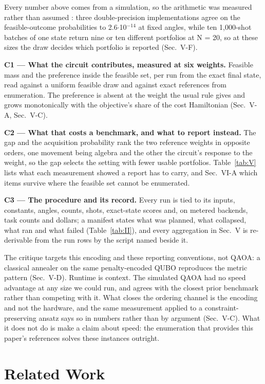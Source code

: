 \documentclass{ieeeaccess}
\begin{document}
Every number above comes from a simulation, so the arithmetic was measured rather than assumed \cite{ref48}: three double-precision implementations agree on the feasible-outcome probabilities to 2.6$\cdot$10$^{-14}$ at fixed angles, while ten 1,000-shot batches of one state return nine or ten different portfolios at N = 20, so at these sizes the draw decides which portfolio is reported (Sec.~V-F).


\textbf{C1 --- What the circuit contributes, measured at six weights.} Feasible mass and the preference inside the feasible set, per run from the exact final state, read against a uniform feasible draw and against exact references from enumeration. The preference is absent at the weight the usual rule gives and grows monotonically with the objective's share of the cost Hamiltonian (Sec.~V-A, Sec.~V-C).


\textbf{C2 --- What that costs a benchmark, and what to report instead.} The gap and the acquisition probability rank the two reference weights in opposite orders, one movement being algebra and the other the circuit's response to the weight, so the gap selects the setting with fewer usable portfolios. Table~\ref{tab:V} lists what each measurement showed a report has to carry, and Sec.~VI-A which items survive where the feasible set cannot be enumerated.


\textbf{C3 --- The procedure and its record.} Every run is tied to its inputs, constants, angles, counts, shots, exact-state scores and, on metered backends, task counts and dollars; a manifest states what was planned, what collapsed, what ran and what failed (Table~\ref{tab:II}), and every aggregation in Sec.~V is re-derivable from the run rows by the script named beside it.


The critique targets this encoding and these reporting conventions, not QAOA: a classical annealer on the same penalty-encoded QUBO reproduces the metric pattern (Sec.~V-D). Runtime is context. The simulated QAOA had no speed advantage at any size we could run, and agrees with the closest prior benchmark \cite{ref8} rather than competing with it. What closes the ordering channel is the encoding and not the hardware, and the same measurement applied to a constraint-preserving ansatz says so in numbers rather than by argument (Sec.~V-C). What it does not do is make a claim about speed: the enumeration that provides this paper's references solves these instances outright.


\section{Related Work}
\end{document}
